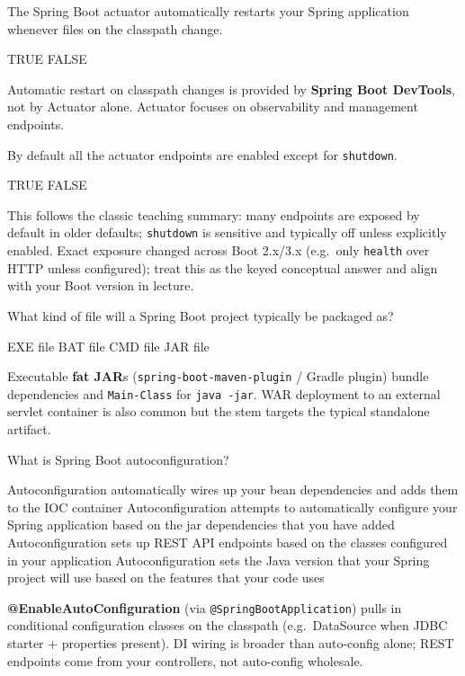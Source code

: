 \question[4]
The Spring Boot actuator automatically restarts your Spring application whenever files on the classpath change.
\begin{choices}
  \choice TRUE
  \CorrectChoice FALSE
\end{choices}
\begin{solution}
  Automatic restart on classpath changes is provided by \textbf{Spring Boot DevTools}, not by Actuator alone. Actuator focuses on observability and management endpoints.
\end{solution}

\question[4]
By default all the actuator endpoints are enabled except for \texttt{shutdown}.
\begin{choices}
  \CorrectChoice TRUE
  \choice FALSE
\end{choices}
\begin{solution}
  This follows the classic teaching summary: many endpoints are exposed by default in older defaults; \texttt{shutdown} is sensitive and typically off unless explicitly enabled. Exact exposure changed across Boot 2.x/3.x (e.g.\ only \texttt{health} over HTTP unless configured); treat this as the keyed conceptual answer and align with your Boot version in lecture.
\end{solution}

\question[4]
What kind of file will a Spring Boot project typically be packaged as?
\begin{choices}
  \choice EXE file
  \choice BAT file
  \choice CMD file
  \CorrectChoice JAR file
\end{choices}
\begin{solution}
  Executable \textbf{fat JAR}s (\texttt{spring-boot-maven-plugin} / Gradle plugin) bundle dependencies and \texttt{Main-Class} for \texttt{java -jar}. WAR deployment to an external servlet container is also common but the stem targets the typical standalone artifact.
\end{solution}

\question[4]
What is Spring Boot autoconfiguration?
\begin{choices}
  \choice Autoconfiguration automatically wires up your bean dependencies and adds them to the IOC container
  \CorrectChoice Autoconfiguration attempts to automatically configure your Spring application based on the jar dependencies that you have added
  \choice Autoconfiguration sets up REST API endpoints based on the classes configured in your application
  \choice Autoconfiguration sets the Java version that your Spring project will use based on the features that your code uses
\end{choices}
\begin{solution}
  \textbf{@EnableAutoConfiguration} (via \texttt{@SpringBootApplication}) pulls in conditional configuration classes on the classpath (e.g.\ DataSource when JDBC starter + properties present). DI wiring is broader than auto-config alone; REST endpoints come from your controllers, not auto-config wholesale.
\end{solution}

